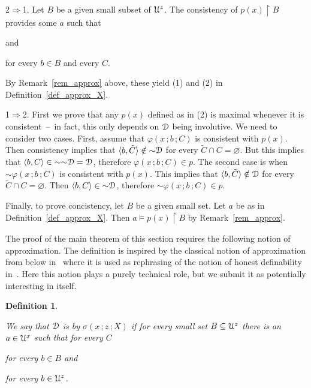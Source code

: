 \documentclass{amsproc}
\makeatletter
\newcounter{thm}
\theoremstyle{mio}
\newtheorem{definition}[thm]{Definition}\tcolorboxenvironment{definition}{mythm}
\providecommand{\proofNameStyle}{\bfseries}
\renewenvironment{proof}[1][\proofname]{\par
  \pushQED{\qed}%
  \normalfont%
  \trivlist
  \item[\hskip\labelsep
        \proofNameStyle
    #1\@addpunct{.}]\ignorespaces
}{%
  \popQED\endtrivlist\@endpefalse
}
\renewcommand*{\emph}[1]{%
   \smash{\tikz[baseline]\node[rectangle, fill=teal!25, rounded corners, inner xsep=0.5ex, inner ysep=0.2ex, anchor=base, minimum height = 2.7ex]{\strut #1};}}
\makeatother
\begin{document}
\begin{proof}
  2$\Rightarrow$1.
  Let $B$ be a given small subset of ${\EuScript U}^z$.
  The consistency of $p(x)\restriction B$ provides some $a$ such that

  \quad and 
  
  \hfill for every $b\in B$ and every $C$. 

  By Remark~\ref{rem_approx} above, these yield (1) and (2) in Definition~\ref{def_approx_X}.
  
  1$\Rightarrow$2.
  First we prove that any $p(x)$ defined as in (2) is maximal whenever it is consistent~--~in fact, this only depends on ${\EuScript D}$ being involutive.
  We need to consider two cases.
  First, assume that $\varphi(x\,;b\,;C)$ is consistent with $p(x)$.
  Then consistency implies that $\langle b,\tilde C\rangle\notin{\sim}{\EuScript D}$ for every $\tilde C\cap C=\varnothing$.
  But this implies that $\langle b, C\rangle\in{\sim}{\sim}{\EuScript D}={\EuScript D}$, therefore $\varphi(x\,;b\,;C)\in p$.
  The second case is when ${\sim}\varphi(x\,;b\,;C)$ is consistent with $p(x)$.
  This implies that $\langle b,\tilde C\rangle\notin{\EuScript D}$ for every $\tilde C\cap C=\varnothing$.
  Then $\langle b,C\rangle\in{\sim}{\EuScript D}$, therefore ${\sim}\varphi(x\,;b\,;C)\in p$.

  Finally, to prove concistency, let $B$ be a given small set.
  Let $a$ be as in Definition~\ref{def_approx_X}.
  Then $a\models p(x)\restriction B$ by Remark~\ref{rem_approx}.
\end{proof}

The proof of the main theorem of this section requires the following notion of approximation.
The definition is inspired by the classical notion of approximation from below in~\cite{Z15} where it is used as rephrasing of the notion of honest definability in~\cite{CS}.
Here this notion plays a purely technical role, but we submit it as potentially interesting in itself.

\begin{definition}\label{def_approx_blw}\strut
  We say that ${\EuScript D}$ is \emph{approximable\/} by $\sigma(x\,;z\,;X)$ \emph{from below\/} if for every small set $B\subseteq{\EuScript U}^z$ there is an $a\in{\EuScript U}^x$ such that for every $C$\smallskip

  \hfill for every $b\in B$ and\smallskip

  \hfill for every $b\in{\EuScript U}^z$.\smallskip
\end{definition}
\end{document}
